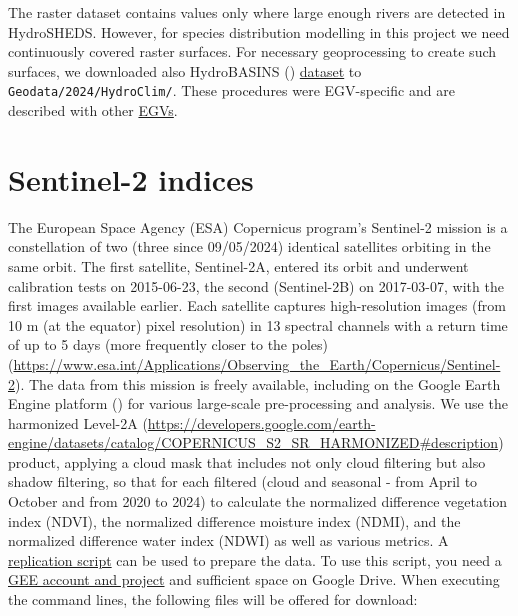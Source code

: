 \documentclass[
]{book}
\newcommand{\passthrough}[1]{#1}
\begin{document}
The raster dataset contains values only where large enough rivers are detected
in HydroSHEDS. However, for species distribution modelling in this project
we need continuously covered raster surfaces. For necessary geoprocessing to create such surfaces, we downloaded also HydroBASINS () \href{https://www.hydrosheds.org/products/hydrobasins}{dataset} to \passthrough{\lstinline!Geodata/2024/HydroClim/!}.
These procedures were EGV-specific and are described with other \hyperref[Ch06]{EGVs}.

\section{Sentinel-2 indices}\label{Ch04.13}

The European Space Agency (ESA) Copernicus program's Sentinel-2 mission is a
constellation of two (three since 09/05/2024) identical satellites orbiting in
the same orbit. The first satellite, Sentinel-2A, entered its orbit and
underwent calibration tests on 2015-06-23, the second (Sentinel-2B) on 2017-03-07,
with the first images available earlier. Each satellite captures high-resolution
images (from 10 m (at the equator) pixel resolution) in 13 spectral channels
with a return time of up to 5 days (more frequently closer to the poles) (\url{https://www.esa.int/Applications/Observing_the_Earth/Copernicus/Sentinel-2}). The
data from this mission is freely available, including on the Google Earth Engine
platform () for various large-scale pre-processing and analysis. We use
the harmonized Level-2A (\url{https://developers.google.com/earth-engine/datasets/catalog/COPERNICUS_S2_SR_HARMONIZED\#description}) product, applying a cloud mask that includes not only cloud filtering but also
shadow filtering, so that for each filtered (cloud and seasonal - from April to
October and from 2020 to 2024) to calculate the normalized difference vegetation
index (NDVI), the normalized difference moisture index (NDMI), and the
normalized difference water index (NDWI) as well as various metrics.
A \href{https://code.earthengine.google.com/78024b3354cccb526159fd865b214771}{replication script}
can be used to prepare the data. To use this script,
you need a \href{https://console.cloud.google.com/earth-engine/welcome}{GEE account and project}
and sufficient space on Google Drive. When executing the command lines, the
following files will be offered for download:
\end{document}
